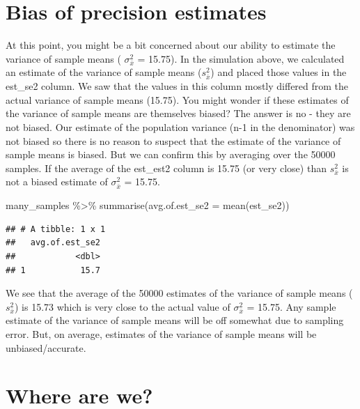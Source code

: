 \documentclass[
]{krantz}
\makeatletter
\newenvironment{Shaded}{\begin{snugshade}}{\end{snugshade}}
\newcommand{\AttributeTok}[1]{\textcolor[rgb]{0.61,0.61,0.61}{#1}}
\newcommand{\FunctionTok}[1]{\textcolor[rgb]{0,0,0}{#1}}
\newcommand{\NormalTok}[1]{#1}
\newcommand{\SpecialCharTok}[1]{\textcolor[rgb]{0,0,0}{#1}}
\newenvironment{kframe}{%
\medskip{}
\setlength{\fboxsep}{.8em}
 \def\at@end@of@kframe{}%
 \ifinner\ifhmode%
  \def\at@end@of@kframe{\end{minipage}}%
  \begin{minipage}{\columnwidth}%
 \fi\fi%
 \def\FrameCommand##1{\hskip\@totalleftmargin \hskip-\fboxsep
 \colorbox{shadecolor}{##1}\hskip-\fboxsep
     \hskip-\linewidth \hskip-\@totalleftmargin \hskip\columnwidth}%
 \MakeFramed {\advance\hsize-\width
   \@totalleftmargin\z@ \linewidth\hsize
   \@setminipage}}%
 {\par\unskip\endMakeFramed%
 \at@end@of@kframe}
\renewenvironment{Shaded}{\begin{kframe}}{\end{kframe}}
\makeatother
\begin{document}
\hypertarget{bias-of-precision-estimates}{%
\section{Bias of precision estimates}\label{bias-of-precision-estimates}}

At this point, you might be a bit concerned about our ability to estimate the variance of sample means ( \(\sigma_{\bar{x}}^2\) = 15.75). In the simulation above, we calculated an estimate of the variance of sample means (\(s_{\bar{x}}^2\)) and placed those values in the est\_se2 column. We saw that the values in this column mostly differed from the actual variance of sample means (15.75). You might wonder if these estimates of the variance of sample means are themselves biased? The answer is no - they are not biased. Our estimate of the population variance (n-1 in the denominator) was not biased so there is no reason to suspect that the estimate of the variance of sample means is biased. But we can confirm this by averaging over the 50000 samples. If the average of the est\_est2 column is 15.75 (or very close) than \(s_{\bar{x}}^2\) is not a biased estimate of \(\sigma_{\bar{x}}^2\) = 15.75.

\begin{Shaded}
\begin{Highlighting}[]
\NormalTok{many\_samples }\SpecialCharTok{\%\textgreater{}\%} 
   \FunctionTok{summarise}\NormalTok{(}\AttributeTok{avg.of.est\_se2 =} \FunctionTok{mean}\NormalTok{(est\_se2))}
\end{Highlighting}
\end{Shaded}

\begin{verbatim}
## # A tibble: 1 x 1
##   avg.of.est_se2
##            <dbl>
## 1           15.7
\end{verbatim}

We see that the average of the 50000 estimates of the variance of sample means (\(s_{\bar{x}}^2\)) is 15.73 which is very close to the actual value of \(\sigma_{\bar{x}}^2\) = 15.75. Any sample estimate of the variance of sample means will be off somewhat due to sampling error. But, on average, estimates of the variance of sample means will be unbiased/accurate.

\hypertarget{where-are-we}{%
\section{Where are we?}\label{where-are-we}}
\end{document}
